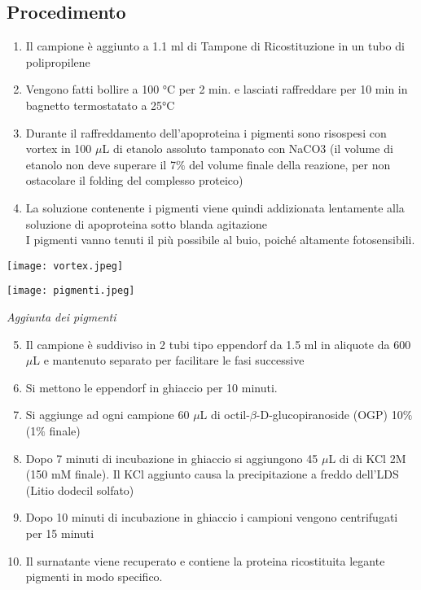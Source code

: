 \documentclass{extarticle}
\begin{document}
\subsection*{Procedimento}
\begin{enumerate}
    \item Il campione è aggiunto a 1.1 ml di Tampone di Ricostituzione in un tubo di polipropilene
    \item Vengono fatti bollire a 100 °C per 2 min. e lasciati raffreddare per 10 min in bagnetto termostatato a 25°C
    \item Durante il raffreddamento dell'apoproteina i pigmenti sono risospesi con vortex in 100 $\mu$L di etanolo assoluto tamponato con NaCO3 (il volume di etanolo non deve superare il 7$\%$ del volume finale della reazione, per non ostacolare il folding del complesso proteico)
    \item La soluzione contenente i pigmenti viene quindi addizionata lentamente alla soluzione di apoproteina sotto blanda agitazione\\
    I pigmenti vanno tenuti il più possibile al buio, poiché altamente fotosensibili.
\end{enumerate}
\begin{minipage}[c]{0.5\textwidth}
    \centering
    \texttt{[image: vortex.jpeg]}
\end{minipage}%
\begin{minipage}[c]{0.5\textwidth}
    \centering
    \texttt{[image: pigmenti.jpeg]}
\end{minipage}
\begin{center}
    \emph{Aggiunta dei pigmenti}
\end{center}
\begin{enumerate}
    \setcounter{enumi}{4}
    \item Il campione è suddiviso in 2 tubi tipo eppendorf da 1.5 ml in aliquote da 600 $\mu$L e mantenuto separato per facilitare le fasi successive
    \item Si mettono le eppendorf in ghiaccio per 10 minuti.
    \item Si aggiunge ad ogni campione 60 $\mu$L di octil-$\beta$-D-glucopiranoside (OGP) 10$\%$ (1$\%$ finale)
    \item Dopo 7 minuti di incubazione in ghiaccio si aggiungono 45 $\mu$L di di KCl 2M (150 mM finale). Il KCl aggiunto causa la precipitazione a freddo dell'LDS (Litio dodecil solfato)
    \item Dopo 10 minuti di incubazione in ghiaccio i campioni vengono centrifugati per 15 minuti
    \item Il surnatante viene recuperato e contiene la proteina ricostituita legante pigmenti in modo specifico. 
\end{enumerate}
\end{document}
